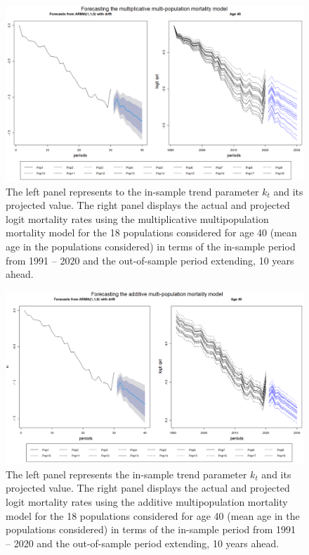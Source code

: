 \begin{figure}[h!]
\centering
\includegraphics*[width=\textwidth]{ForecastMult.png}
\caption{The left panel represents to the in-sample trend parameter $k_t$ and its projected value. The right panel displays the actual and projected logit mortality rates using the multiplicative multipopulation mortality model for the 18 populations considered for age 40 (mean age in the populations considered) in terms of the in-sample period from 1991 – 2020 and the out-of-sample period extending, 10 years ahead.}
\label{ForecasMult}
\end{figure}

\begin{figure}[h!]
\centering
\includegraphics*[width=\textwidth]{ForecastAddi.png}
\caption{The left panel represents the in-sample trend parameter $k_t$ and its projected value. The right panel displays the actual and projected logit mortality rates using the additive multipopulation mortality model for the 18 populations considered for age 40 (mean age in the populations considered) in terms of the in-sample period from 1991 – 2020 and the out-of-sample period extending, 10 years ahead.}
\label{ForecastAddi}
\end{figure}

